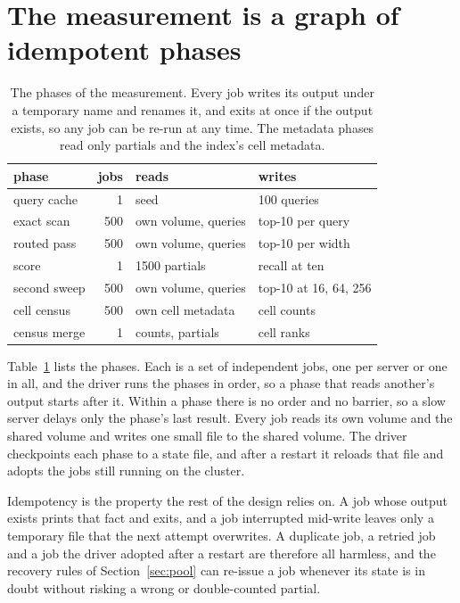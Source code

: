 \documentclass[sigconf, nonacm]{acmart}
\begin{document}
\section{The measurement is a graph of idempotent phases}
\label{sec:phases}

\begin{table}[t]
\caption{The phases of the measurement. Every job writes its output under a temporary name and
renames it, and exits at once if the output exists, so any job can be re-run at any time. The
metadata phases read only partials and the index's cell metadata.}
\label{tab:phases}
\centering
\small
\setlength{\tabcolsep}{3pt}
\begin{tabular}{lrll}
\toprule
phase & jobs & reads & writes \\
\midrule
query cache    & 1   & seed & 100 queries \\
exact scan     & 500 & own volume, queries & top-10 per query \\
routed pass    & 500 & own volume, queries & top-10 per width \\
score          & 1   & 1500 partials & recall at ten \\
second sweep   & 500 & own volume, queries & top-10 at 16, 64, 256 \\
cell census    & 500 & own cell metadata & cell counts \\
census merge   & 1   & counts, partials & cell ranks \\
\bottomrule
\end{tabular}
\end{table}

Table~\ref{tab:phases} lists the phases. Each is a set of independent jobs, one per server or one
in all, and the driver runs the phases in order, so a phase that reads another's output starts
after it. Within a phase there is no order and no barrier, so a slow server delays only the
phase's last result. Every job reads its own volume and the shared volume and writes one small
file to the shared volume. The driver checkpoints each phase to a state file, and after a restart
it reloads that file and adopts the jobs still running on the cluster.

Idempotency is the property the rest of the design relies on. A job whose output exists prints
that fact and exits, and a job interrupted mid-write leaves only a temporary file that the next
attempt overwrites. A duplicate job, a retried job and a job the driver adopted after a restart
are therefore all harmless, and the recovery rules of Section~\ref{sec:pool} can re-issue a job
whenever its state is in doubt without risking a wrong or double-counted partial.
\end{document}
